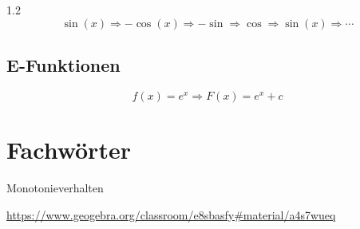 \documentclass{article}
\newcommand{\Zeilenabstand}{1.2}
\begin{document}
\begin{spacing}{\Zeilenabstand}
            \begin{equation}
                \sin(x)\Rightarrow-\cos(x)\Rightarrow-\sin\Rightarrow\cos\Rightarrow\sin(x)\Rightarrow\cdots
            \end{equation}

        \subsection{E-Funktionen}

            \begin{equation}
                f(x)=e^{x} \Rightarrow F(x)=e^{x}+c
            \end{equation}

            


    
    

    \section{Fachwörter}

    

    Monotonieverhalten

    \url{https://www.geogebra.org/classroom/e8sbasfy#material/a4s7wueq}

    \end{spacing}
\end{document}
